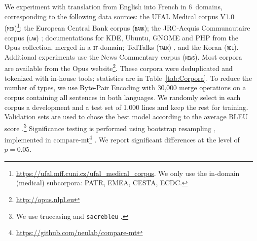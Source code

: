\documentclass[11pt]{article}
\newcommand{\fyDone}[1]{\done[FY]\Todo[FY:]{\textcolor{orange}{#1}}}
\newcommand{\domain}[1]{\texttt{\textsc{#1}}}
\begin{document}
We experiment with translation from English into French in 6~domains, corresponding to the following data sources: the UFAL Medical corpus V1.0 (\domain{med})\footnote{\url{https://ufal.mff.cuni.cz/ufal_medical_corpus}. We only use the in-domain (medical) subcorpora: PATR, EMEA, CESTA, ECDC.}; the European Central Bank corpus (\domain{bank}); the JRC-Acquis Communautaire corpus (\domain{law}) \cite{Steinberger06acquis}; documentations for KDE, Ubuntu, GNOME and PHP from the Opus collection, merged in a \domain{it}-domain; TedTalks (\domain{talk}) \cite{Cettolo12wit}, and the Koran (\domain{rel}). Additional experiments use the News Commentary corpus (\domain{news}). Most corpora are available from the Opus website\footnote{\url{http://opus.nlpl.eu}}. These corpora were deduplicated and tokenized with in-house tools; statistics are in Table~\ref{tab:Corpora}. To reduce the number of types, we use Byte-Pair Encoding \cite{Sennrich16BPE} with 30,000 merge operations on a corpus containing all sentences in both languages.\fyDone{Add \# number of tokens, also specificity ?}%
%
We randomly select in each corpus a development and a test set of 1,000 lines and keep the rest for training. Validation sets are used to chose the best model according to the average BLEU score \cite{Post18call}.\footnote{We use truecasing and \texttt{sacrebleu} \cite{Post18call}.}\fyDone{A word about meta-parameter settings} Significance testing is performed using bootstrap resampling \cite{Koehn04statistical}, implemented in compare-mt\footnote{\url{https://github.com/neulab/compare-mt}} \cite{Neubig19compare-mt}. We report significant differences at the level of $p=0.05$.\fyDone{Fix correct p value}
\end{document}
